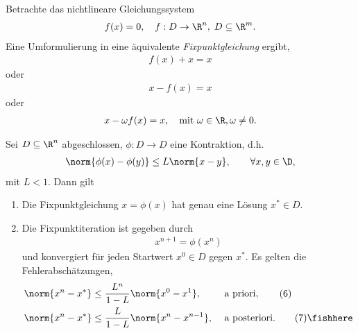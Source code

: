 Betrachte das nichtlineare Gleichungssystem
\begin{align*}
f(x) = 0,\quad f: D\to\R^n,\; D\subseteq \R^m.
\end{align*}
Eine Umformulierung in eine äquivalente \emph{Fixpunktgleichung} ergibt,
\begin{align*}
f(x) + x = x
\end{align*}
oder
\begin{align*}
x - f(x) = x
\end{align*}
oder
\begin{align*}
x-\omega f(x) = x,\quad \text{mit }\omega\in\R,\omega\neq 0.
\end{align*}

\begin{prop}
\label{prop:5.3}
Sei $D\subseteq \R^n$ abgeschlossen, $\phi: D\to D$ eine
Kontraktion, d.h.
\begin{align*}
\norm{\phi(x)-\phi(y)} \le L\norm{x-y},\qquad \forall x,y\in\D,
\end{align*}
mit $L< 1$. Dann gilt
\begin{enumerate}[label=(\roman{*})]
  \item Die Fixpunktgleichung $x = \phi(x)$ hat genau eine Lösung $x^*\in D$.
  \item Die Fixpunktiteration ist gegeben durch
\begin{align*}
x^{n+1} = \phi(x^n)
\end{align*}
und konvergiert für jeden Startwert $x^0\in D$ gegen $x^*$. Es gelten die
Fehlerabschätzungen,
\begin{align*}
&\norm{x^n - x^*} \le \frac{L^n}{1-L}\norm{x^0 - x^1},&&\text{ a
priori},\tag{6}\\
&\norm{x^n - x^*} \le
\frac{L}{1-L}\norm{x^n-x^{n-1}},&&\text{ a posteriori}.\tag{7}\fishhere
\end{align*}
\end{enumerate}
\end{prop}
